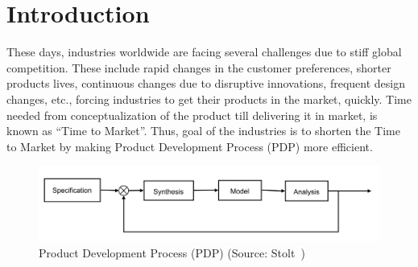 

\section{Introduction}


These days, industries worldwide are facing several challenges due to stiff global competition. These include rapid changes in the customer preferences, shorter products lives, continuous changes due to disruptive innovations, frequent design changes, etc., forcing industries to get their products in the market, quickly. Time needed from conceptualization of the product till delivering it in market, is known as ``Time to Market''. Thus, goal of the industries is to shorten the Time to Market by making Product Development Process (PDP) more efficient. 

	\bigskip
	
	\begin{figure} [!h]
		\centering
		\includegraphics[width=0.9\linewidth]{images/PDPProcess.png}
		\caption{Product Development Process (PDP) (Source: Stolt~\cite{Stolt2008})}
		\label{fig:introduction:PDPProcess}
	\end{figure}
	
